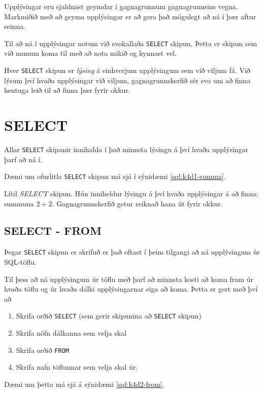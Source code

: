Upplýsingar eru sjaldnast geymdar í gagnagrunnum gagnagrunnsins vegna. Markmiðið með að geyma upplýsingar er að gera það mögulegt að ná í þær aftur seinna.

Til að ná í upplýsingar notum við svokallaða \verb|SELECT| skipun. Þetta er skipun sem við munum koma til með að nota mikið og kynnast vel.

Hver \verb|SELECT| skipun er \emph{lýsing} á einhverjum upplýsingum sem við viljum fá. Við lýsum því hvaða upplýsingar við viljum, gagnagrunnskerfið sér svo um að finna hentuga leið til að finna þær fyrir okkur.
\section{SELECT}
Allar \verb|SELECT| skipanir innihalda í það minnsta lýsingu á því hvaða upplýsingar þarf að ná í.

Dæmi um ofurlitla \verb|SELECT| skipun má sjá í sýnidæmi \ref{sql:k4d1-summa}.

\begin{example}
\caption[Lágmarks SELECT]{Lítil \emph{SELECT} skipun. Hún inniheldur lýsingu á því hvaða upplýsingar á að finna: summuna $2+2$. Gagnagrunnskerfið getur reiknað hana út fyrir okkur.}
\label{sql:k4d1-summa}
\centering
{}
\end{example}

\subsection{SELECT - FROM}
Þegar \verb|SELECT| skipun er skrifuð er það oftast í þeim tilgangi að ná upplýsingum úr SQL-töflu.

Til þess að ná upplýsingum úr töflu með þarf að minnsta kosti að koma fram úr hvaða töflu og úr hvaða dálki upplýsingarnar eiga að koma. Þetta er gert með því að 

\begin{enumerate}
 \item Skrifa orðið \verb|SELECT| (sem gerir skipunina að \verb|SELECT| skipun)
 \item Skrifa nöfn dálkanna sem velja skal
 \item Skrifa orðið \verb|FROM|
 \item Skrifa nafn töflunnar sem velja skal úr.
\end{enumerate}

Dæmi um þetta má sjá á sýnidæmi \ref{sql:k4d2-from}.

